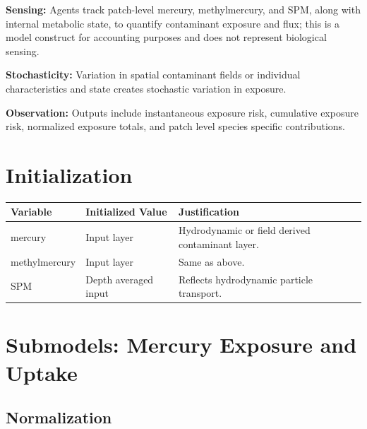 \documentclass[
]{book}
\begin{document}
\textbf{Sensing:} Agents track patch-level mercury, methylmercury, and SPM,
along with internal metabolic state, to quantify contaminant exposure
and flux; this is a model construct for accounting purposes and does not
represent biological sensing.

\textbf{Stochasticity:} Variation in spatial contaminant fields or individual
characteristics and state creates stochastic variation in exposure.

\textbf{Observation:} Outputs include instantaneous exposure risk, cumulative
exposure risk, normalized exposure totals, and patch level species
specific contributions.

\section{Initialization}\label{initialization-4}

\begin{longtable}[]{@{}
  >{\raggedright\arraybackslash}p{}
  >{\raggedright\arraybackslash}p{}
  >{\raggedright\arraybackslash}p{}@{}}
\toprule\noalign{}
\begin{minipage}[b]{\linewidth}\raggedright
Variable
\end{minipage} & \begin{minipage}[b]{\linewidth}\raggedright
Initialized Value
\end{minipage} & \begin{minipage}[b]{\linewidth}\raggedright
Justification
\end{minipage} \\
\midrule\noalign{}
\endhead
\bottomrule\noalign{}
\endlastfoot
mercury & Input layer & Hydrodynamic or field derived contaminant layer. \\
methylmercury & Input layer & Same as above. \\
SPM & Depth averaged input & Reflects hydrodynamic particle transport. \\
\end{longtable}

\section{Submodels: Mercury Exposure and Uptake}\label{submodels-mercury-exposure-and-uptake}

\subsection{Normalization}\label{normalization}
\end{document}
